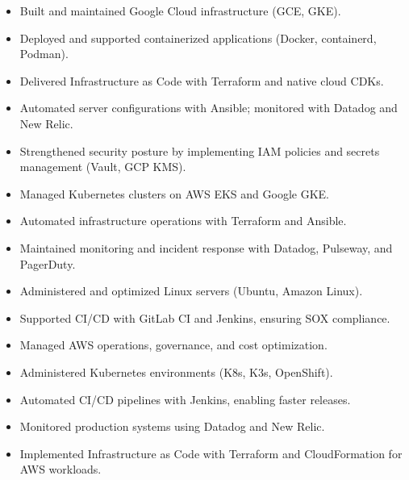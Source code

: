 \documentclass[10pt,a4paper,withhyper]{altacv}
\begin{document}
\divider

\begin{itemize}
  \item Built and maintained Google Cloud infrastructure (GCE, GKE).
  \item Deployed and supported containerized applications (Docker, containerd, Podman).
  \item Delivered Infrastructure as Code with Terraform and native cloud CDKs.
  \item Automated server configurations with Ansible; monitored with Datadog and New Relic.
  \item Strengthened security posture by implementing IAM policies and secrets management (Vault, GCP KMS).
\end{itemize}

\divider

\begin{itemize}
  \item Managed Kubernetes clusters on AWS EKS and Google GKE.
  \item Automated infrastructure operations with Terraform and Ansible.
  \item Maintained monitoring and incident response with Datadog, Pulseway, and PagerDuty.
  \item Administered and optimized Linux servers (Ubuntu, Amazon Linux).
  \item Supported CI/CD with GitLab CI and Jenkins, ensuring SOX compliance.
\end{itemize}

\divider

\begin{itemize}
  \item Managed AWS operations, governance, and cost optimization.
  \item Administered Kubernetes environments (K8s, K3s, OpenShift).
  \item Automated CI/CD pipelines with Jenkins, enabling faster releases.
  \item Monitored production systems using Datadog and New Relic.
  \item Implemented Infrastructure as Code with Terraform and CloudFormation for AWS workloads.
\end{itemize}
\end{document}
